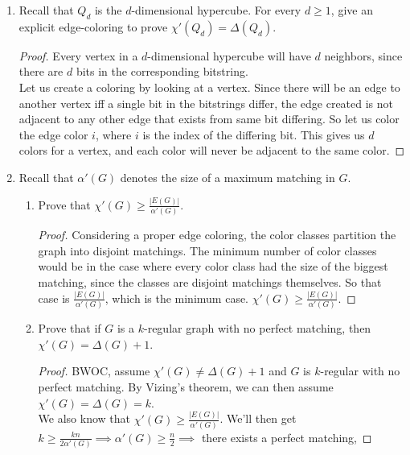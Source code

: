 \documentclass[12pt]{article}
\begin{document}
	\begin{enumerate}

\item Recall that $Q_d$ is the $d$-dimensional hypercube. For every $d \geq 1$, give an explicit edge-coloring to prove $\chi'(Q_d) = \Delta(Q_d)$. 
\begin{proof}
	Every vertex in a $d$-dimensional hypercube will have $d$ neighbors, since there are $d$ bits in the corresponding bitstring.\\
	Let us create a coloring by looking at a vertex. Since there will be an edge to another vertex iff a single bit in the bitstrings differ, the edge created is not adjacent to any other edge that exists from same bit differing. So let us color the edge color $i$, where $i$ is the index of the differing bit. This gives us $d$ colors for a vertex, and each color will never be adjacent to the same color.
\end{proof}
\medskip 

\item Recall that $\alpha'(G)$ denotes the size of a maximum matching in $G$.
\begin{enumerate}
\item Prove that $\chi'(G) \geq \frac{|E(G)|}{\alpha'(G)}$. 
\begin{proof}
	Considering a proper edge coloring, the color classes partition the graph into disjoint matchings. The minimum number of color classes would be in the case where every color class had the size of the biggest matching, since the classes are disjoint matchings themselves. So that case is $\frac{|E(G)|}{\alpha'(G)}$, which is the minimum case. \Therefore $\chi'(G) \geq \frac{|E(G)|}{\alpha'(G)}$. 
\end{proof}
\item Prove that if $G$ is a $k$-regular graph with no perfect matching, then $\chi'(G) =\Delta(G)+1$. 	
\begin{proof}
	BWOC, assume $\chi'(G) \neq \Delta(G)+1$ and $G$ is $k$-regular with no perfect matching. By Vizing's theorem, we can then assume $\chi'(G) = \Delta(G) = k$.\\
	We also know that $\chi'(G)\geq\frac{|E(G)|}{\alpha'(G)}$. We'll then get $k \geq \frac{kn}{2\alpha'(G)} \implies \alpha'(G)\geq \frac{n}{2} \implies$ there exists a perfect matching, \contra
	
\end{proof}
\end{enumerate}


\medskip


\end{enumerate}
\end{document}
